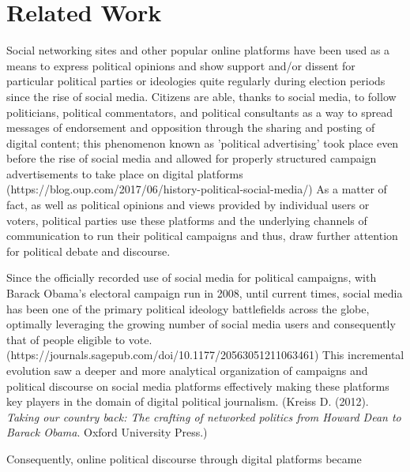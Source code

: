\section{Related Work}

Social networking sites and other popular online platforms have been used as a means to express political opinions and show support and/or dissent for particular political parties or ideologies quite regularly during election periods since the rise of social media. Citizens are able, thanks to social media, to follow politicians, political commentators, and political consultants as a way to spread messages of endorsement and opposition through the sharing and posting of digital content; this phenomenon known as 'political advertising' took place even before the rise of social media and allowed for properly structured campaign advertisements to take place on digital platforms (https://blog.oup.com/2017/06/history-political-social-media/) As a matter of fact, as well as political opinions and views provided by individual users or voters, political parties use these platforms and the underlying channels of communication to run their political campaigns and thus, draw further attention for political debate and discourse. 

Since the officially recorded use of social media for political campaigns, with Barack Obama's electoral campaign run in 2008, until current times, social media has been one of the primary political ideology battlefields across the globe, optimally leveraging the growing number of social media users and consequently that of people eligible to vote. (https://journals.sagepub.com/doi/10.1177/20563051211063461) This incremental evolution saw a deeper and more analytical organization of campaigns and political discourse on social media platforms effectively making these platforms key players in the domain of digital political journalism. (Kreiss D. (2012). \textit{Taking our country back: The crafting of networked politics from Howard Dean to Barack Obama}. Oxford University Press.)

Consequently, online political discourse through digital platforms became 
